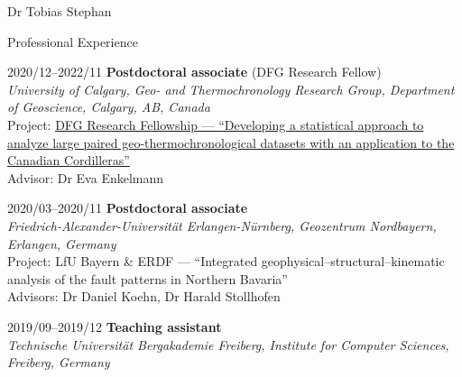 \documentclass[10pt, paper=letter]{scrartcl} %
\begin{document}
\begin{cv}{Dr Tobias Stephan}
\begin{cvlist}{Professional Experience}
\item[2020/12--2022/11] \textbf{Postdoctoral associate} (DFG Research Fellow)\\
    \textit{University of Calgary, Geo- and Thermochronology Research Group, Department of Geoscience, Calgary, AB, Canada}\\
    Project: \href{https://gepris.dfg.de/gepris/projekt/439621066?language=en}{DFG Research Fellowship --- 
    \enquote{Developing a statistical approach to analyze large paired geo-thermochronological datasets with an application to the Canadian Cordilleras}}\\
    Advisor: Dr Eva Enkelmann

    \item[2020/03--2020/11] \textbf{Postdoctoral associate}\\
        \textit{
    Friedrich-Alexander-Universit\"at Erlangen-N\"urnberg, Geozentrum Nordbayern, \mbox{Erlangen}, Germany} \\ Project: LfU Bayern \& ERDF --- \enquote{Integrated geophysical–structural–kinematic analysis of the fault patterns in Northern Bavaria}\\
    Advisors: Dr Daniel Koehn, Dr Harald Stollhofen
    
    \item[2019/09--2019/12] \textbf{Teaching assistant}\\
        \textit{Technische Universit\"at Bergakademie Freiberg, Institute for Computer Sciences, Freiberg, Germany}
        

\end{cvlist}
\end{cv}
\end{document}
